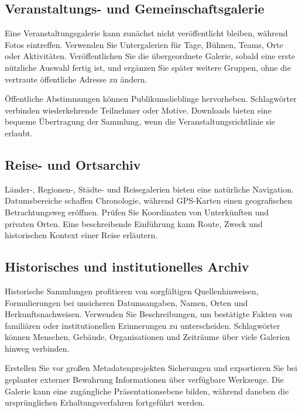\documentclass[11pt,a4paper]{article}
\begin{document}
\subsection{Veranstaltungs- und Gemeinschaftsgalerie}

Eine Veranstaltungsgalerie kann zunächst nicht veröffentlicht bleiben, während
Fotos eintreffen. Verwenden Sie Untergalerien für Tage, Bühnen, Teams, Orte oder
Aktivitäten. Veröffentlichen Sie die übergeordnete Galerie, sobald eine erste
nützliche Auswahl fertig ist, und ergänzen Sie später weitere Gruppen, ohne die
vertraute öffentliche Adresse zu ändern.

Öffentliche Abstimmungen können Publikumslieblinge hervorheben. Schlagwörter
verbinden wiederkehrende Teilnehmer oder Motive. Downloads bieten eine bequeme
Übertragung der Sammlung, wenn die Veranstaltungsrichtlinie sie erlaubt.

\subsection{Reise- und Ortsarchiv}

Länder-, Regionen-, Städte- und Reisegalerien bieten eine natürliche Navigation.
Datumsbereiche schaffen Chronologie, während GPS-Karten einen geografischen
Betrachtungsweg eröffnen. Prüfen Sie Koordinaten von Unterkünften und privaten
Orten. Eine beschreibende Einführung kann Route, Zweck und historischen Kontext
einer Reise erläutern.

\subsection{Historisches und institutionelles Archiv}

Historische Sammlungen profitieren von sorgfältigen Quellenhinweisen,
Formulierungen bei unsicheren Datumsangaben, Namen, Orten und
Herkunftsnachweisen. Verwenden Sie Beschreibungen, um bestätigte Fakten von
familiären oder institutionellen Erinnerungen zu unterscheiden. Schlagwörter
können Menschen, Gebäude, Organisationen und Zeiträume über viele Galerien
hinweg verbinden.

Erstellen Sie vor großen Metadatenprojekten Sicherungen und exportieren Sie bei
geplanter externer Bewahrung Informationen über verfügbare Werkzeuge. Die
Galerie kann eine zugängliche Präsentationsebene bilden, während daneben die
ursprünglichen Erhaltungsverfahren fortgeführt werden.
\end{document}
